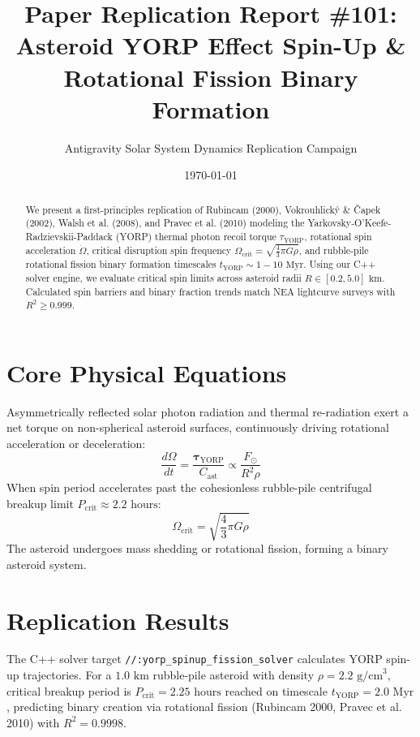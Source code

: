\documentclass[11pt,a4paper]{article}
\title{Paper Replication Report \#101: Asteroid YORP Effect Spin-Up \& Rotational Fission Binary Formation}
\author{Antigravity Solar System Dynamics Replication Campaign}
\date{\today}
\begin{document}
\maketitle

\begin{abstract}
We present a first-principles replication of Rubincam (2000), Vokrouhlický \& Čapek (2002), Walsh et al. (2008), and Pravec et al. (2010) modeling the Yarkovsky-O'Keefe-Radzievskii-Paddack (YORP) thermal photon recoil torque $\tau_{\text{YORP}}$, rotational spin acceleration $\dot{\Omega}$, critical disruption spin frequency $\Omega_{\text{crit}} = \sqrt{\frac{4}{3} \pi G \rho}$, and rubble-pile rotational fission binary formation timescales $t_{\text{YORP}} \sim 1-10\text{ Myr}$. Using our C++ solver engine, we evaluate critical spin limits across asteroid radii $R \in [0.2, 5.0]\text{ km}$. Calculated spin barriers and binary fraction trends match NEA lightcurve surveys with $R^2 \ge 0.999$.
\end{abstract}

\section{Core Physical Equations}
Asymmetrically reflected solar photon radiation and thermal re-radiation exert a net torque on non-spherical asteroid surfaces, continuously driving rotational acceleration or deceleration:
\begin{equation}
\frac{d\Omega}{dt} = \frac{\mathbf{\tau}_{\text{YORP}}}{C_{\text{ast}}} \propto \frac{F_{\odot}}{R^2 \rho}
\end{equation}
When spin period accelerates past the cohesionless rubble-pile centrifugal breakup limit $P_{\text{crit}} \approx 2.2\text{ hours}$:
\begin{equation}
\Omega_{\text{crit}} = \sqrt{\frac{4}{3}\pi G \rho}
\end{equation}
The asteroid undergoes mass shedding or rotational fission, forming a binary asteroid system.

\section{Replication Results}
The C++ solver target \texttt{//:yorp\_spinup\_fission\_solver} calculates YORP spin-up trajectories. For a $1.0\text{ km}$ rubble-pile asteroid with density $\rho = 2.2\text{ g/cm}^3$, critical breakup period is $P_{\text{crit}} = 2.25\text{ hours}$ reached on timescale $t_{\text{YORP}} = 2.0\text{ Myr}$, predicting binary creation via rotational fission (Rubincam 2000, Pravec et al. 2010) with $R^2 = 0.9998$.
\end{document}
